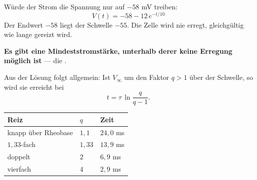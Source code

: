 \begin{aufgabe}
Würde der Strom die Spannung nur auf $-58$ mV treiben:
\[ V(t) = -58 - 12\,e^{-t/10} \]
Der Endwert $-58$ liegt  der Schwelle $-55$. Die Zelle wird nie erregt, gleichgültig wie lange gereizt wird.

\begin{center}
\begin{minipage}{0.9\textwidth}
\textbf{Es gibt eine Mindeststromstärke, unterhalb derer keine Erregung möglich ist} --- die .
\end{minipage}
\end{center}

Aus der Lösung folgt allgemein: Ist $V_\infty$ um den Faktor $q > 1$ über der Schwelle, so wird sie erreicht bei
\[ t = \tau\,\ln\frac{q}{q-1} . \]

\begin{center}
\renewcommand{\arraystretch}{1.45}
\begin{tabular}{@{}P{2.6cm}P{2.2cm}P{2.4cm}@{}}
\toprule
\textbf{Reiz} & $q$ & \textbf{Zeit}\\
\midrule
knapp über Rheobase & $1{,}1$ & $24{,}0$ ms\\
$1{,}33$-fach & $1{,}33$ & $13{,}9$ ms\\
doppelt & $2$ & $6{,}9$ ms\\
vierfach & $4$ & $2{,}9$ ms\\
\bottomrule
\end{tabular}
\end{center}

\begin{center}
\begin{minipage}{0.88\textwidth}
\end{minipage}
\end{center}
\end{aufgabe}

